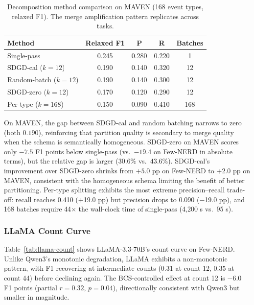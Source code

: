 \documentclass[11pt,a4paper]{article}
\begin{document}
\begin{table}[t]
\centering
\caption{Decomposition method comparison on MAVEN (168 event types, relaxed F1). The merge amplification pattern replicates across tasks.}
\label{tab:maven-decomp}
\begin{tabular}{lcccc}
\toprule
\textbf{Method} & \textbf{Relaxed F1} & \textbf{P} & \textbf{R} & \textbf{Batches} \\
\midrule
Single-pass            & 0.245 & 0.280 & 0.220 & 1 \\
SDGD-cal ($k\!=\!12$) & 0.190 & 0.140 & 0.320 & 12 \\
Random-batch ($k\!=\!12$)  & 0.190 & 0.140 & 0.300 & 12 \\
SDGD-zero ($k\!=\!12$)& 0.170 & 0.120 & 0.290 & 12 \\
Per-type ($k\!=\!168$) & 0.150 & 0.090 & 0.410 & 168 \\
\bottomrule
\end{tabular}
\end{table}

On MAVEN, the gap between SDGD-cal and random batching narrows to zero (both $0.190$), reinforcing that partition quality is secondary to merge quality when the schema is semantically homogeneous. SDGD-zero on MAVEN scores only $-7.5$ F1 points below single-pass (vs.\ $-19.4$ on Few-NERD in absolute terms), but the relative gap is larger ($30.6\%$ vs.\ $43.6\%$). SDGD-cal's improvement over SDGD-zero shrinks from $+5.0$ pp on Few-NERD to $+2.0$ pp on MAVEN, consistent with the homogeneous schema limiting the benefit of better partitioning. Per-type splitting exhibits the most extreme precision--recall trade-off: recall reaches 0.410 ($+$19.0 pp) but precision drops to 0.090 ($-$19.0 pp), and 168 batches require 44$\times$ the wall-clock time of single-pass (4{,}200 s vs.\ 95 s).

\subsubsection{LLaMA Count Curve}

Table~\ref{tab:llama-count} shows LLaMA-3.3-70B's count curve on Few-NERD. Unlike Qwen3's monotonic degradation, LLaMA exhibits a non-monotonic pattern, with F1 recovering at intermediate counts (0.31 at count 12, 0.35 at count 44) before declining again. The BCS-controlled effect at count 12 is $-6.0$ F1 points ($\text{partial } r = 0.32$, $p = 0.04$), directionally consistent with Qwen3 but smaller in magnitude.
\end{document}
